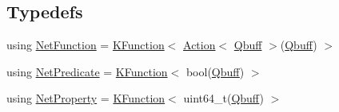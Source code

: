 \subsection*{Typedefs}
\begin{DoxyCompactItemize}
\item 
using \hyperlink{namespacepfq_1_1lang_aa68bcd4318570ab85efa3d1aa4c997eb}{Net\+Function} = \hyperlink{structpfq_1_1lang_1_1KFunction}{K\+Function}$<$ \hyperlink{structpfq_1_1lang_1_1Action}{Action}$<$ \hyperlink{structpfq_1_1lang_1_1Qbuff}{Qbuff} $>$(\hyperlink{structpfq_1_1lang_1_1Qbuff}{Qbuff}) $>$
\item 
using \hyperlink{namespacepfq_1_1lang_a81905bab0f0cbcdb83d62b840af6943e}{Net\+Predicate} = \hyperlink{structpfq_1_1lang_1_1KFunction}{K\+Function}$<$ bool(\hyperlink{structpfq_1_1lang_1_1Qbuff}{Qbuff}) $>$
\item 
using \hyperlink{namespacepfq_1_1lang_a0c784c3d4623b8b9fd1d8fd8f67a4854}{Net\+Property} = \hyperlink{structpfq_1_1lang_1_1KFunction}{K\+Function}$<$ uint64\+\_\+t(\hyperlink{structpfq_1_1lang_1_1Qbuff}{Qbuff}) $>$
\end{DoxyCompactItemize}
